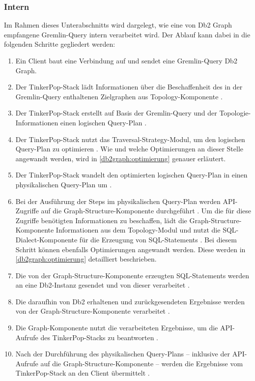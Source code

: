 \subsubsection{Intern}
Im Rahmen dieses Unterabschnitts wird dargelegt, wie eine von Db2 Graph empfangene Gremlin-Query intern verarbeitet wird. Der Ablauf kann dabei in die folgenden Schritte gegliedert werden: 

\begin{enumerate}
    \item Ein Client baut eine Verbindung auf und sendet eine Gremlin-Query Db2 Graph.
    \item Der TinkerPop-Stack lädt Informationen über die Beschaffenheit des in der Gremlin-Query enthaltenen Zielgraphen aus Topology-Komponente \cite{vldb_tian,sigmod_tian, yt_tian}.
    \item Der TinkerPop-Stack erstellt auf Basis der Gremlin-Query und der Topologie-Informationen einen logischen Query-Plan \cite{vldb_tian,sigmod_tian, yt_tian}. 
    \item Der TinkerPop-Stack nutzt das Traversal-Strategy-Modul, um den logischen Query-Plan zu optimieren \cite{vldb_tian,sigmod_tian, yt_tian}. Wie und welche Optimierungen an dieser Stelle angewandt werden, wird in \autoref{db2graph:optimierung} genauer erläutert.
    \item Der TinkerPop-Stack wandelt den optimierten logischen Query-Plan in einen physikalischen Query-Plan um \cite{vldb_tian,sigmod_tian, yt_tian}. 
    \item Bei der Ausführung der Steps im physikalischen Query-Plan werden API-Zugriffe auf die Graph-Structure-Komponente durchgeführt \cite{vldb_tian,sigmod_tian, yt_tian}. Um die für diese Zugriffe benötigten Informationen zu beschaffen, lädt die Graph-Structure-Komponente Informationen aus dem Topology-Modul und nutzt die SQL-Dialect-Komponente für die Erzeugung von SQL-Statements \cite{vldb_tian,sigmod_tian, yt_tian}. Bei diesem Schritt können ebenfalls Optimierungen angewandt werden. Diese werden in \autoref{db2graph:optimierung} detailliert beschrieben.
    \item Die von der Graph-Structure-Komponente erzeugten SQL-Statements werden an eine Db2-Instanz gesendet und von dieser verarbeitet \cite{vldb_tian,sigmod_tian, yt_tian}.
    \item Die daraufhin von Db2 erhaltenen und zurückgesendeten Ergebnisse werden von der Graph-Structure-Komponente verarbeitet \cite{yt_tian}. 
    \item Die Graph-Komponente nutzt die verarbeiteten Ergebnisse, um die API-Aufrufe des TinkerPop-Stacks zu beantworten \cite{vldb_tian,sigmod_tian, yt_tian}.
    \item Nach der Durchführung des physikalischen Query-Plans -- inklusive der API-Aufrufe auf die Graph-Structure-Komponente -- werden die Ergebnisse vom TinkerPop-Stack an den Client übermittelt \cite{vldb_tian,sigmod_tian, yt_tian}.
\end{enumerate}

